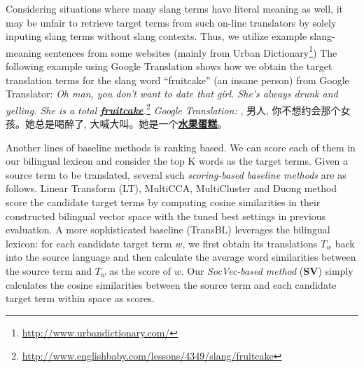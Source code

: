 Considering situations where many slang terms have literal meaning as well, it may be unfair to retrieve target terms from such on-line translators by solely inputing slang terms without slang contexts. 
Thus, we utilize example slang-meaning sentences from some websites (mainly from Urban 
Dictionary\footnote{\scriptsize{\url{http://www.urbandictionary.com/}}}) 
The following example using Google Translation shows how we obtain the target translation terms for the slang word ``fruitcake'' (an insane person) from Google Translator:
{\textit{Oh man, you don't want to date that girl. She's always drunk and yelling. She is a total \underline{\textbf{fruitcake}}.}}\footnote{\scriptsize{\url{http://www.englishbaby.com/lessons/4349/slang/fruitcake}}} 
\textit{Google Translation:}
{, 男人, 你不想约会那个女孩。她总是喝醉了, 大喊大叫。她是一个\underline{\textbf{水果蛋糕}}。}

Another lines of baseline methods is ranking based.
We can score each of them in our bilingual lexicon and consider the top K words as the target terms. 
Given a source term to be translated, several such {\em scoring-based baseline methods} are as follows.
Linear Transform (LT), MultiCCA, MultiCluster and Duong method score the candidate target terms by 
computing cosine similarities in their constructed bilingual vector space with the tuned best settings in previous evaluation. 
A more sophisticated baseline (TransBL) leverages the bilingual lexicon: 
for each candidate target term $w$, we first obtain its translations 
$T_w$ back into the source language and then calculate the average word similarities between the source term and $T_w$  as the score of $w$. 
Our {\em SocVec-based method} (\textbf{SV}) simply calculates the cosine similarities between the source term and each candidate target term within \textit{\socvec} space as scores.


